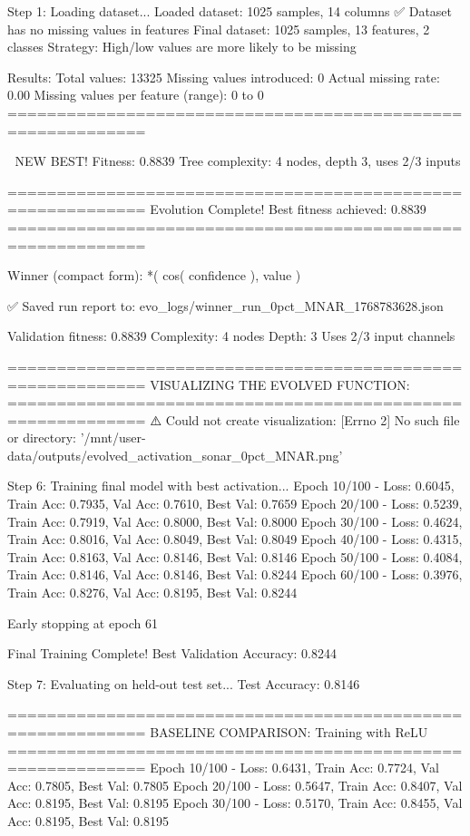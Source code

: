 Step 1: Loading dataset...
Loaded dataset: 1025 samples, 14 columns
✅ Dataset has no missing values in features
Final dataset: 1025 samples, 13 features, 2 classes
Strategy: High/low values are more likely to be missing

Results:
  Total values: 13325
  Missing values introduced: 0
  Actual missing rate: 0.00%
  Missing values per feature (range): 0 to 0
============================================================


🎯 NEW BEST! Fitness: 0.8839
Tree complexity: 4 nodes, depth 3, uses 2/3 inputs

============================================================
Evolution Complete!
Best fitness achieved: 0.8839
============================================================

Winner (compact form):
 *(
  cos(
    confidence
  ),
  value
)

✅ Saved run report to: evo_logs/winner_run_0pct_MNAR_1768783628.json

Validation fitness: 0.8839
Complexity: 4 nodes
Depth: 3
Uses 2/3 input channels

============================================================
VISUALIZING THE EVOLVED FUNCTION:
============================================================
⚠️ Could not create visualization: [Errno 2] No such file or directory: '/mnt/user-data/outputs/evolved_activation_sonar_0pct_MNAR.png'

Step 6: Training final model with best activation...
Epoch  10/100 - Loss: 0.6045, Train Acc: 0.7935, Val Acc: 0.7610, Best Val: 0.7659
Epoch  20/100 - Loss: 0.5239, Train Acc: 0.7919, Val Acc: 0.8000, Best Val: 0.8000
Epoch  30/100 - Loss: 0.4624, Train Acc: 0.8016, Val Acc: 0.8049, Best Val: 0.8049
Epoch  40/100 - Loss: 0.4315, Train Acc: 0.8163, Val Acc: 0.8146, Best Val: 0.8146
Epoch  50/100 - Loss: 0.4084, Train Acc: 0.8146, Val Acc: 0.8146, Best Val: 0.8244
Epoch  60/100 - Loss: 0.3976, Train Acc: 0.8276, Val Acc: 0.8195, Best Val: 0.8244

Early stopping at epoch 61

Final Training Complete!
Best Validation Accuracy: 0.8244

Step 7: Evaluating on held-out test set...
Test Accuracy: 0.8146

============================================================
BASELINE COMPARISON: Training with ReLU
============================================================
Epoch  10/100 - Loss: 0.6431, Train Acc: 0.7724, Val Acc: 0.7805, Best Val: 0.7805
Epoch  20/100 - Loss: 0.5647, Train Acc: 0.8407, Val Acc: 0.8195, Best Val: 0.8195
Epoch  30/100 - Loss: 0.5170, Train Acc: 0.8455, Val Acc: 0.8195, Best Val: 0.8195

